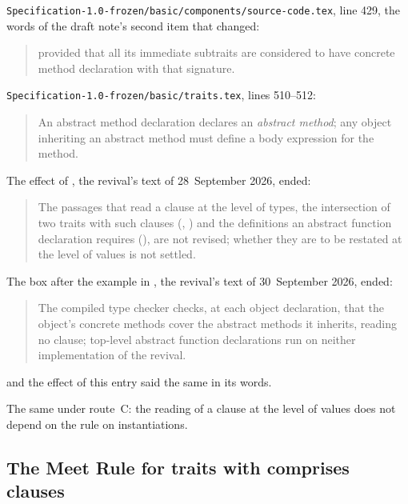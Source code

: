 \begin{description}
\begin{quote}
\end{quote}
\nolinkurl{Specification-1.0-frozen/basic/components/source-code.tex}, line
429, the words of the draft note's second item that changed:
\begin{quote}
provided that all its immediate subtraits are considered to have concrete
method declaration with that signature.
\end{quote}
\nolinkurl{Specification-1.0-frozen/basic/traits.tex}, lines 510--512:
\begin{quote}
An abstract method declaration declares an \emph{abstract method}; any object
inheriting an abstract method must define a body expression for the method.
\end{quote}
The effect of , the revival's text of 28~September
2026, ended:
\begin{quote}
The passages that read a  clause at the level of types, the
intersection of two traits with such clauses (,
) and the definitions an abstract function
declaration requires (), are not revised;
whether they are to be restated at the level of values is not settled.
\end{quote}
The box after the example in , the
revival's text of 30~September 2026, ended:
\begin{quote}
The compiled type checker checks, at each object declaration, that the
object's concrete methods cover the abstract methods it inherits, reading no
 clause; top-level abstract function declarations run on neither
implementation of the revival.
\end{quote}
and the effect of this entry said the same in its words.
\item[Route C] The same under route~C: the reading of a  clause
at the level of values does not depend on the rule on instantiations.
\end{description}

\subsection{The Meet Rule for traits with comprises clauses}

